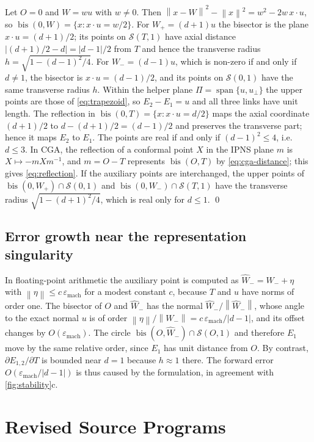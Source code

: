 \documentclass[11pt,a4paper]{article}
\theoremstyle{plain}
\theoremstyle{definition}
\theoremstyle{remark}
\newcommand{\norm}[1]{\left\lVert#1\right\rVert}
\newcommand{\abs}[1]{\left\lvert#1\right\rvert}
\newcommand{\bis}{\operatorname{bis}}
\newcommand{\Sph}{\mathcal{S}}
\begin{document}
Let $O=0$ and $W=wu$ with $w\neq0$. Then $\norm{x-W}^2-\norm{x}^2=w^2-2w\,x\cdot u$,
so $\bis(0,W)=\{x: x\cdot u=w/2\}$. For $W_+=(d+1)u$ the bisector is the plane
$x\cdot u=(d+1)/2$; its points on $\Sph(T,1)$ have axial distance
$\abs{(d+1)/2-d}=\abs{d-1}/2$ from $T$ and hence the transverse radius
$h=\sqrt{1-(d-1)^2/4}$. For $W_-=(d-1)u$, which is non-zero if and only if
$d\neq1$, the bisector is $x\cdot u=(d-1)/2$, and its points on $\Sph(0,1)$ have
the same transverse radius $h$. Within the helper plane $\Pi=\operatorname{span}
\{u,u_\perp\}$ the upper points are those of \cref{eq:trapezoid}, so
$E_2-E_1=u$ and all three links have unit length. The reflection in
$\bis(0,T)=\{x:x\cdot u=d/2\}$ maps the axial coordinate $(d+1)/2$ to
$d-(d+1)/2=(d-1)/2$ and preserves the transverse part; hence it maps $E_2$ to
$E_1$. The points are real if and only if $(d-1)^2\le4$, i.e.\ $d\le3$. In CGA,
the reflection of a conformal point $X$ in the IPNS plane $m$ is $X\mapsto-mXm^{-1}$,
and $m=O-T$ represents $\bis(O,T)$ by \cref{eq:cga-distance}; this gives
\cref{eq:reflection}. If the auxiliary points are interchanged, the upper points
of $\bis(0,W_+)\cap\Sph(0,1)$ and $\bis(0,W_-)\cap\Sph(T,1)$ have the transverse
radius $\sqrt{1-(d+1)^2/4}$, which is real only for $d\le1$. \qed

\subsection{Error growth near the representation singularity}\label{app:epsilon}

In floating-point arithmetic the auxiliary point is computed as
$\widehat W_-=W_-+\eta$ with $\norm{\eta}\le c\,\varepsilon_{\mathrm{mach}}$ for a
modest constant $c$, because $T$ and $u$ have norms of order one. The bisector of
$O$ and $\widehat W_-$ has the normal $\widehat W_-/\norm{\widehat W_-}$, whose
angle to the exact normal $u$ is of order $\norm{\eta}/\norm{W_-}=
c\,\varepsilon_{\mathrm{mach}}/\abs{d-1}$, and its offset changes by
$O(\varepsilon_{\mathrm{mach}})$. The circle $\bis(O,\widehat W_-)\cap\Sph(O,1)$
and therefore $E_1$ move by the same relative order, since $E_1$ has unit
distance from $O$. By contrast, $\partial E_{1,2}/\partial T$ is bounded near
$d=1$ because $h\approx1$ there. The forward error
$O(\varepsilon_{\mathrm{mach}}/\abs{d-1})$ is thus caused by the formulation,
in agreement with \cref{fig:stability}c.

\section{Revised Source Programs}\label{app:programs}
\end{document}
